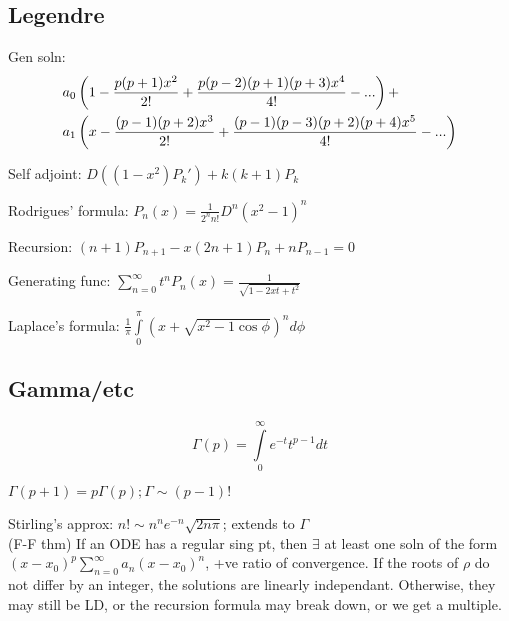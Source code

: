 \documentclass[12pt]{article}
\begin{document}
\subsection{Legendre}

Gen soln: \begin{align}
a_0&\left(1-\frac{p(p+1)x^2}{2!}+\frac{p(p-2)(p+1)(p+3)x^4}{4!} - ...\right)+\notag\\
a_1&\left(x-\frac{(p-1)(p+2)x^3}{2!}+\frac{(p-1)(p-3)(p+2)(p+4)x^5}{4!} - ...\right)\notag
\end{align}

Self adjoint: $D((1-x^2)P_k')+k(k+1)P_k$

Rodrigues' formula: $P_n(x)=\frac{1}{2^nn!}D^n(x^2-1)^n$

Recursion: $(n+1)P_{n+1}-x(2n+1)P_n+nP_{n-1}=0$

Generating func: $\sum\limits_{n=0}^\infty t^nP_n(x) = \frac1{\sqrt{1-2xt+t^2}}$

Laplace's formula: $\frac{1}{\pi}\int\limits_0^\pi (x+ \sqrt{x^2-1\cos\phi})^nd\phi$
\subsection{Gamma/etc}
$$\Gamma(p)=\int\limits_0^\infty e^{-t}t^{p-1}dt$$

$\Gamma(p+1)=p\Gamma(p); \Gamma \sim (p-1)!$

Stirling's approx: $n! \sim n^ne^{-n}\sqrt{2n\pi}$; extends to $\Gamma$\\

(F-F thm) If an ODE has a regular sing pt, then $\exists$ at least one soln of the form $(x-x_0)^p\sum\limits_{n=0}^\infty a_n(x-x_0)^n$, +ve ratio of convergence. If the roots of $\rho$ do not differ by an integer, the solutions are linearly independant. Otherwise, they may still be LD, or the recursion formula may break down, or we get a multiple.
\end{document}
